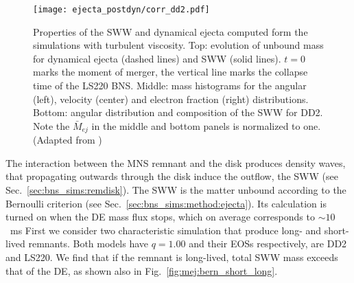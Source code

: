 \begin{figure}[t]
    \centering
    \texttt{[image: ejecta\_postdyn/corr\_dd2.pdf]}
    \caption{Properties of the \ac{SWW} and dynamical ejecta
        computed form the simulations with turbulent viscosity.
        Top: evolution of unbound mass for dynamical ejecta
        (dashed lines)
        and \ac{SWW}
        (solid lines). $t=0$ marks the moment of merger, the vertical
        line marks the collapse time of the LS220 BNS.
        Middle: mass histograms for the angular (left), velocity (center) and electron
        fraction (right) distributions.
        Bottom: angular distribution and composition of the \ac{SWW}
        for DD2.
        Note the $\bar{M}_{ej}$ in the middle and bottom panels is normalized to one.
        (Adapted from \citet{Nedora:2019jhl})
    }
    \label{fig:ej_properties}
    
\end{figure}



The interaction between the \ac{MNS} remnant and the disk produces density waves, 
that propagating outwards through the disk induce the outflow, 
the \ac{SWW} (see Sec.~\ref{sec:bns_sims:remdisk}).
%
The \ac{SWW} is the matter unbound according to the Bernoulli criterion 
(see Sec.~\ref{sec:bns_sims:method:ejecta}). Its calculation is turned on when
the \ac{DE} mass flux stops, which on average corresponds to ${\sim10}$~ms \pmerg{} 
%
First we consider two characteristic simulation that produce long- and short-lived
remnants. Both models have $q=1.00$ and their \acp{EOS} respectively, are DD2 and LS220. 
We find that if the remnant is long-lived, total \ac{SWW} mass exceeds that of the \ac{DE},
as shown also in Fig.~\ref{fig:mej:bern_short_long}.
%

